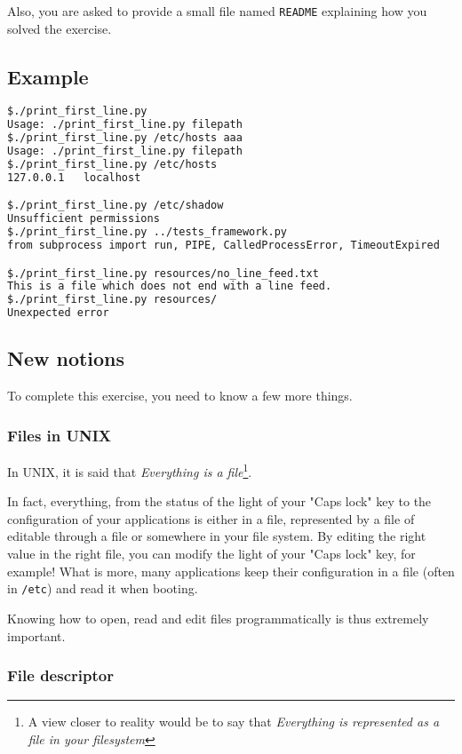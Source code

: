 \documentclass[12pt]{article}
\begin{document}
Also, you are asked to provide a small file named \texttt{README} explaining how you solved the exercise.

\subsection{Example}

\begin{lstlisting}[language=bash]
$./print_first_line.py 
Usage: ./print_first_line.py filepath
$./print_first_line.py /etc/hosts aaa
Usage: ./print_first_line.py filepath
$./print_first_line.py /etc/hosts
127.0.0.1	localhost

$./print_first_line.py /etc/shadow
Unsufficient permissions
$./print_first_line.py ../tests_framework.py 
from subprocess import run, PIPE, CalledProcessError, TimeoutExpired

$./print_first_line.py resources/no_line_feed.txt 
This is a file which does not end with a line feed.
$./print_first_line.py resources/
Unexpected error
\end{lstlisting}

\subsection{New notions}

To complete this exercise, you need to know a few more things.

\subsubsection{Files in UNIX}

In UNIX, it is said that \textit{Everything is a file}\footnote{A view closer to reality would be to say that \textit{Everything is represented as a file in your filesystem}}.

In fact, everything, from the status of the light of your "Caps lock" key to the configuration of your applications is either in a file, represented by a file of editable through a file or somewhere in your file system. By editing the right value in the right file, you can modify the light of your "Caps lock" key, for example!
What is more, many applications keep their configuration in a file (often in \texttt{/etc}) and read it when booting.

Knowing how to open, read and edit files programmatically is thus extremely important.

\subsubsection{File descriptor}
\end{document}
